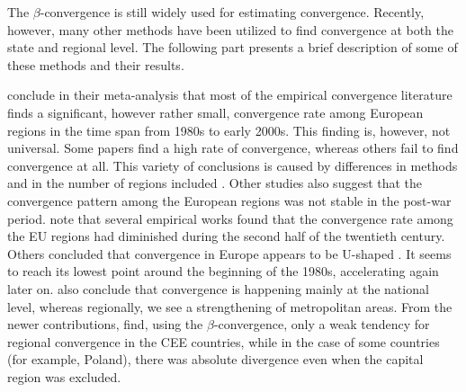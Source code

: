 \documentclass[11pt]{article}
\begin{document}
The $\beta$-convergence is still widely used for estimating convergence. Recently, however, many other methods have been utilized to find convergence at both the state and regional level. The following part presents a brief description of some of these methods and their results.
  

\citet{eckey2007convergence} conclude in their meta-analysis that most of the empirical convergence literature finds a significant, however rather small, convergence rate among European regions in the time span from 1980s to early 2000s. This finding is, however, not universal. Some papers find a high rate of convergence, whereas others fail to find convergence at all. This variety of conclusions is caused by differences in methods and in the number of regions included \citep{eckey2007convergence}. Other studies also suggest that the convergence pattern among the European regions was not stable in the post-war period. \citet{eckey2007convergence} note that several empirical works found that the convergence rate among the EU regions had diminished during the second half of the twentieth century. Others concluded that convergence in Europe appears to be U-shaped \citep{basile2001regional, geppert2008regional}. It seems to reach its lowest point around the beginning of the 1980s, accelerating again later on. \citet{geppert2008regional} also conclude that convergence is happening mainly at the national level, whereas regionally, we see a strengthening of metropolitan areas. From the newer contributions, \citet*{sme2012regional} find, using the $\beta$-convergence, only a weak tendency for regional convergence in the CEE countries, while in the case of some countries (for example, Poland), there was absolute divergence even when the capital region was excluded. %
 
\end{document}
